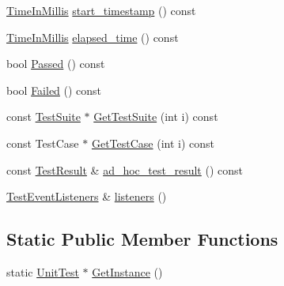 \begin{DoxyCompactItemize}
\item 
\hyperlink{namespacetesting_a992de1d091ce660f451d1e8b3ce30fd6}{Time\+In\+Millis} \hyperlink{classtesting_1_1UnitTest_ab6dc32e9f385f164df02899b2b440f04}{start\+\_\+timestamp} () const
\item 
\hyperlink{namespacetesting_a992de1d091ce660f451d1e8b3ce30fd6}{Time\+In\+Millis} \hyperlink{classtesting_1_1UnitTest_a410e14e52f505dabe2054e5018e9ca33}{elapsed\+\_\+time} () const
\item 
bool \hyperlink{classtesting_1_1UnitTest_a7c9b327bc14cb8a282c789dc6513a55b}{Passed} () const
\item 
bool \hyperlink{classtesting_1_1UnitTest_a706f29e765916616b11a271a65948727}{Failed} () const
\item 
const \hyperlink{classtesting_1_1TestSuite}{Test\+Suite} $\ast$ \hyperlink{classtesting_1_1UnitTest_a906e19e244ccc129bcc62fe2f3632e1c}{Get\+Test\+Suite} (int i) const
\item 
const Test\+Case $\ast$ \hyperlink{classtesting_1_1UnitTest_adf55eb1cc81a43d40ddef75fadded1de}{Get\+Test\+Case} (int i) const
\item 
const \hyperlink{classtesting_1_1TestResult}{Test\+Result} \& \hyperlink{classtesting_1_1UnitTest_afb26f53c070675638033436f35bad889}{ad\+\_\+hoc\+\_\+test\+\_\+result} () const
\item 
\hyperlink{classtesting_1_1TestEventListeners}{Test\+Event\+Listeners} \& \hyperlink{classtesting_1_1UnitTest_a1b7387b0b3daa2433ed6b685027bf285}{listeners} ()
\end{DoxyCompactItemize}
\subsection*{Static Public Member Functions}
\begin{DoxyCompactItemize}
\item 
static \hyperlink{classtesting_1_1UnitTest}{Unit\+Test} $\ast$ \hyperlink{classtesting_1_1UnitTest_af254e2e695471eb9f128bc556bae3668}{Get\+Instance} ()
\end{DoxyCompactItemize}
